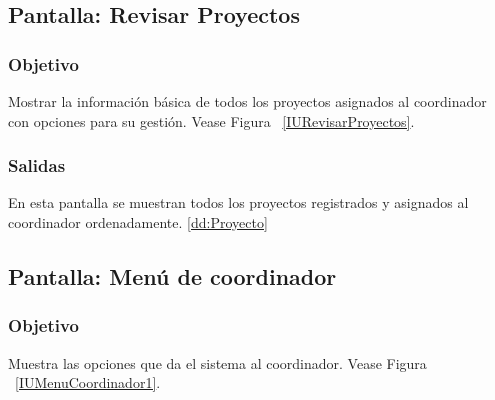 \subsection{Pantalla: Revisar Proyectos}
\subsubsection{Objetivo}

Mostrar la información básica de todos los proyectos asignados al coordinador con opciones para su gestión. Vease Figura ~\ref{IURevisarProyectos}.

\subsubsection{Salidas}
En esta pantalla se muestran todos los proyectos registrados y asignados al coordinador ordenadamente. \ref{dd:Proyecto}
% 
% 


\subsection{Pantalla: Menú de coordinador}
\subsubsection{Objetivo}
Muestra las opciones que da el sistema al coordinador. Vease Figura ~\ref{IUMenuCoordinador1}.

